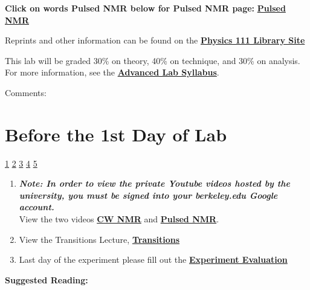 \documentclass{../lab}
\begin{document}
\textbf{Click on words Pulsed NMR below for Pulsed NMR page:  }\href{http://experimentationlab.berkeley.edu/PulsedNMR}{\textbf{Pulsed NMR}}

Reprints and other information can be found on the \href{http://physics111.lib.berkeley.edu/Physics111/Reprints/NMR/NMR\_index.html}{\textbf{Physics 111 Library Site}}

This lab will be graded 30\% on theory, 40\% on technique, and 30\% on analysis. For more information, see the \href{\AdvancedLabSyllabus}{\textbf{Advanced Lab Syllabus}}.

Comments: \Feedback

\section{Before the 1st Day of Lab}

\signatures \hyperlink{Resonance Condition and Symmetry}{1} \hyperlink{Setup Pictures}{2} \hyperlink{CW Setup}{3} \hyperlink{Scanning Frequency}{4} \hyperlink{Mn Sample Traces}{5} 

\begin{enumerate}
    \item \emph{\textbf{Note: In order to view the private Youtube videos hosted by the university, you must be signed into your berkeley.edu Google account.}}\\
    View the two videos \href{http://youtu.be/q\_Rtbr7YEJY}{\textbf{CW NMR}} and \href{http://youtu.be/\_sXDn-ChOUY}{\textbf{Pulsed NMR}}.

    \item View the Transitions Lecture, \href{http://youtu.be/xOMgdVP3AfE}{\textbf{Transitions}}

    \item Last day of the experiment please fill out the \href{\ExperimentEvaluation}{\textbf{Experiment Evaluation}}

\end{enumerate}

\textbf{Suggested Reading:}
\end{document}
